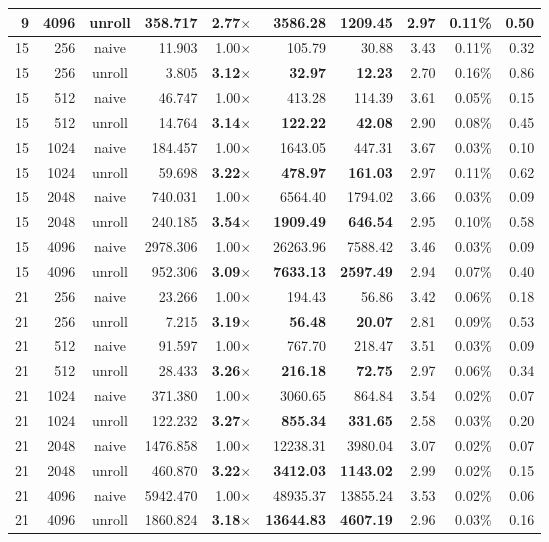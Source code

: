 \documentclass[11pt,a4paper]{article}
\begin{document}
{\begin{longtable}{rrcrrrrrrr}
9 & 4096 & unroll & 358.717 & \textbf{2.77$\times$} & \textbf{3586.28} & \textbf{1209.45} & 2.97 & 0.11\% & 0.50 \\
\midrule
15 & 256 & naive & 11.903 & 1.00$\times$ & 105.79 & 30.88 & 3.43 & 0.11\% & 0.32 \\
15 & 256 & unroll & 3.805 & \textbf{3.12$\times$} & \textbf{32.97} & \textbf{12.23} & 2.70 & 0.16\% & 0.86 \\
\midrule
15 & 512 & naive & 46.747 & 1.00$\times$ & 413.28 & 114.39 & 3.61 & 0.05\% & 0.15 \\
15 & 512 & unroll & 14.764 & \textbf{3.14$\times$} & \textbf{122.22} & \textbf{42.08} & 2.90 & 0.08\% & 0.45 \\
\midrule
15 & 1024 & naive & 184.457 & 1.00$\times$ & 1643.05 & 447.31 & 3.67 & 0.03\% & 0.10 \\
15 & 1024 & unroll & 59.698 & \textbf{3.22$\times$} & \textbf{478.97} & \textbf{161.03} & 2.97 & 0.11\% & 0.62 \\
\midrule
15 & 2048 & naive & 740.031 & 1.00$\times$ & 6564.40 & 1794.02 & 3.66 & 0.03\% & 0.09 \\
15 & 2048 & unroll & 240.185 & \textbf{3.54$\times$} & \textbf{1909.49} & \textbf{646.54} & 2.95 & 0.10\% & 0.58 \\
\midrule
15 & 4096 & naive & 2978.306 & 1.00$\times$ & 26263.96 & 7588.42 & 3.46 & 0.03\% & 0.09 \\
15 & 4096 & unroll & 952.306 & \textbf{3.09$\times$} & \textbf{7633.13} & \textbf{2597.49} & 2.94 & 0.07\% & 0.40 \\
\midrule
21 & 256 & naive & 23.266 & 1.00$\times$ & 194.43 & 56.86 & 3.42 & 0.06\% & 0.18 \\
21 & 256 & unroll & 7.215 & \textbf{3.19$\times$} & \textbf{56.48} & \textbf{20.07} & 2.81 & 0.09\% & 0.53 \\
\midrule
21 & 512 & naive & 91.597 & 1.00$\times$ & 767.70 & 218.47 & 3.51 & 0.03\% & 0.09 \\
21 & 512 & unroll & 28.433 & \textbf{3.26$\times$} & \textbf{216.18} & \textbf{72.75} & 2.97 & 0.06\% & 0.34 \\
\midrule
21 & 1024 & naive & 371.380 & 1.00$\times$ & 3060.65 & 864.84 & 3.54 & 0.02\% & 0.07 \\
21 & 1024 & unroll & 122.232 & \textbf{3.27$\times$} & \textbf{855.34} & \textbf{331.65} & 2.58 & 0.03\% & 0.20 \\
\midrule
21 & 2048 & naive & 1476.858 & 1.00$\times$ & 12238.31 & 3980.04 & 3.07 & 0.02\% & 0.07 \\
21 & 2048 & unroll & 460.870 & \textbf{3.22$\times$} & \textbf{3412.03} & \textbf{1143.02} & 2.99 & 0.02\% & 0.15 \\
\midrule
21 & 4096 & naive & 5942.470 & 1.00$\times$ & 48935.37 & 13855.24 & 3.53 & 0.02\% & 0.06 \\
21 & 4096 & unroll & 1860.824 & \textbf{3.18$\times$} & \textbf{13644.83} & \textbf{4607.19} & 2.96 & 0.03\% & 0.16 \\
\midrule
\end{longtable}
}
\end{document}
